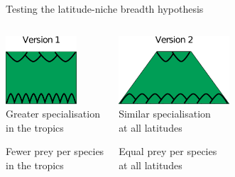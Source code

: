 \documentclass{beamer}
\begin{document}
  \begin{frame}{Testing the latitude-niche breadth hypothesis}
    \begin{columns}
    \column{.5in}
    \column{1.75in}
      \begin{center}
      \includegraphics[height=1in]{Figures/version1.eps}\\
      \vspace{.5cm}
      Greater specialisation\\in the tropics

      \vspace{.25cm}
      Fewer prey per species\\in the tropics

      \end{center}
    \column{.5in}
    \column{1.75in}
      \begin{center}
      \includegraphics[height=1in]{Figures/version2.eps}\\
      \vspace{.5cm}
      Similar specialisation\\at all latitudes

      \vspace{.25cm}
      Equal prey per species\\at all latitudes

      \end{center}
    \column{.5in}
    \end{columns}

    \vspace{.5cm}

    \begin{center}
      \color{white}{Generality : mean number of prey per species}
    \end{center}
  \end{frame}
\end{document}
